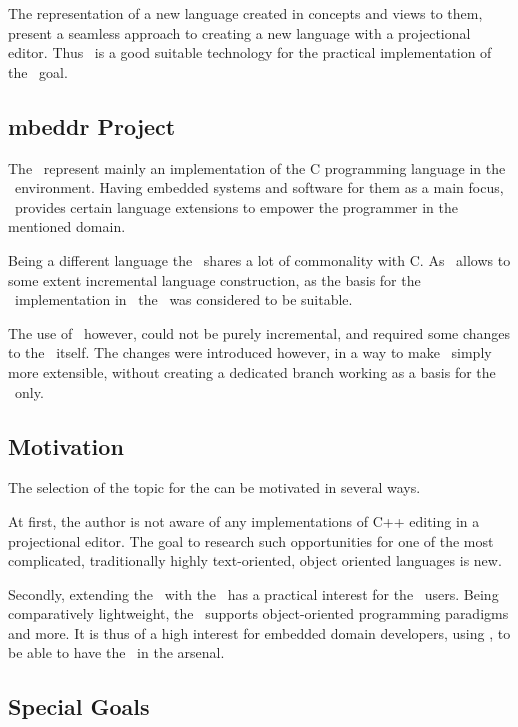The representation of a new language created in concepts and views to them, present a seamless approach to creating a new language with a projectional editor.
Thus \jbmps\ is a good suitable technology for the practical implementation of the \MT\ goal.

\subsection{mbeddr Project}

The \mbdrp\ represent mainly an implementation of the C programming language in the \jbmps\ environment. Having embedded systems
and software for them as a main focus, \mbdr\ provides certain language extensions to empower the programmer in the mentioned domain. 

Being a different language the \cpppl\ shares a lot of commonality with C. As \jbmps\ allows to some extent incremental language construction,
as the basis for the \cpppl\ implementation in \jbmps\ the \mbdrp\ was considered to be suitable. 

The use of \mbdr\, however, could not be purely incremental, and required some changes to the \mbdr\ itself. 
The changes were introduced however, in a way to make \mbdr\ simply more extensible, 
without creating a dedicated branch working as a basis for the \cpppl\ only.

\subsection{Motivation}

The selection of the topic for the \MT can be motivated in several ways.

At first, the author is not aware of any implementations of C++ editing in a projectional editor. The goal to research
such opportunities for one of the most complicated, traditionally highly text-oriented, object oriented languages is
new.

Secondly, extending the \mbdrp\ with the \cpppl\ has a practical interest for the \mbdrp\ users. Being comparatively lightweight,
the \cpppl\ supports object-oriented programming paradigms and more. It is thus of a high interest for embedded domain developers, using \mbdr,
to be able to have the \cpppl\ in the arsenal.

\subsection{Special Goals}

